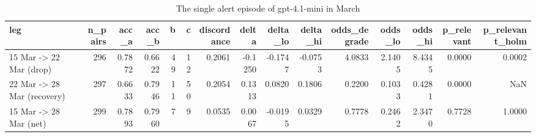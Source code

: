 \begin{table}
\caption{The single alert episode of gpt-4.1-mini in March}
\label{tab:table-alert-episode-legs}
\begin{tabular}{lrrrrrrrrrrrrrr}
\toprule
leg & n\_pairs & acc\_a & acc\_b & b & c & discordance & delta & delta\_lo & delta\_hi & odds\_degrade & odds\_lo & odds\_hi & p\_relevant & p\_relevant\_holm \\
\midrule
15 Mar -> 22 Mar (drop) & 296 & 0.7872 & 0.6622 & 49 & 12 & 0.2061 & -0.1250 & -0.1747 & -0.0753 & 4.0833 & 2.1405 & 8.4345 & 0.0000 & 0.0002 \\
22 Mar -> 28 Mar (recovery) & 297 & 0.6633 & 0.7946 & 11 & 50 & 0.2054 & 0.1313 & 0.0820 & 0.1806 & 0.2200 & 0.1033 & 0.4281 & 0.0000 & NaN \\
15 Mar -> 28 Mar (net) & 299 & 0.7893 & 0.7960 & 7 & 9 & 0.0535 & 0.0067 & -0.0195 & 0.0329 & 0.7778 & 0.2462 & 2.3470 & 0.7728 & 1.0000 \\
\bottomrule
\end{tabular}
\end{table}
